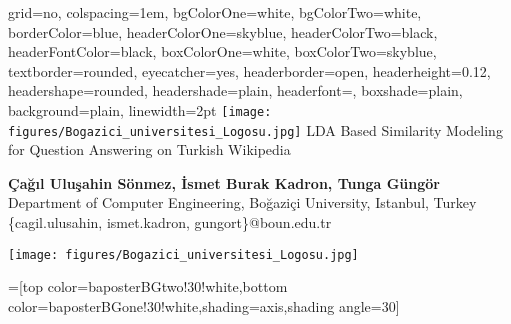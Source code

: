 \documentclass[landscape,final]{baposter}
\begin{document}
\begin{poster}{
  grid=no,
  colspacing=1em,
  bgColorOne=white,
  bgColorTwo=white,
  borderColor=blue,
  headerColorOne=skyblue,
  headerColorTwo=black,
  headerFontColor=black,
  boxColorOne=white,
  boxColorTwo=skyblue,
  textborder=rounded,
  eyecatcher=yes,
  headerborder=open,
  headerheight=0.12\textheight,
  headershape=rounded,
  headershade=plain,
  headerfont=\Large\textsf, %
  boxshade=plain,
  background=plain,
  linewidth=2pt
  }
  {\texttt{[image: figures/Bogazici\_universitesi\_Logosu.jpg]}} %
  {\sf \vspace{5pt}%
  \vspace{-14pt}
  LDA Based Similarity Modeling for Question Answering on Turkish Wikipedia
}
  {\sf \Large \vspace{5pt} %
  	\textbf{Çağıl Uluşahin Sönmez, İsmet Burak Kadron, Tunga Güngör}\\
    Department of Computer Engineering, Bo\u{g}azi\c{c}i University, Istanbul, Turkey\\
    \{cagil.ulusahin, ismet.kadron, gungort\}@boun.edu.tr

  }
  {\texttt{[image: figures/Bogazici\_universitesi\_Logosu.jpg]}
  }

  =[top color=baposterBGtwo!30!white,bottom color=baposterBGone!30!white,shading=axis,shading angle=30]

     \newlength{\leftimgwidth}
     \setlength{\leftimgwidth}{0.78em+8.0em}

    \newcommand{\colouredcircle}[1]{%
      \tikz{\useasboundingbox (-0.2em,-0.32em) rectangle(0.2em,0.32em); \draw[draw=black,fill=baposterBGone!80!black!#1!white,line width=0.03em] (0,0) circle(0.18em);}}


\end{poster}
\end{document}
